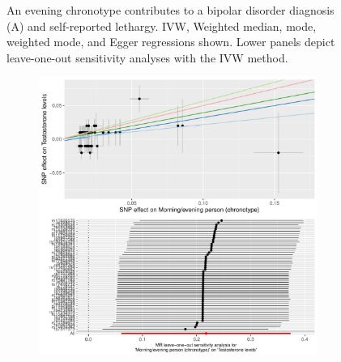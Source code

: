 \documentclass{article}
\begin{document}
\begin{figure}[htbp]
\begin{subfigure}[b]{0.4\textwidth}
         \caption{}
         \label{beer}
     \end{subfigure}
        \caption{An evening chronotype contributes to a bipolar disorder diagnosis (A) and self-reported lethargy. IVW, Weighted median, mode, weighted mode, and Egger regressions shown. Lower panels depict leave-one-out sensitivity analyses with the IVW method.}
        \label{bplethargy}
\end{figure}

\begin{figure}[htbp]
     \centering
     \begin{subfigure}[b]{0.4\textwidth}
         \centering
         \includegraphics[width=\textwidth]{Figs/Analysis2/Morning_evening_person_(chronotype)_vs_Testosterone_levels.Plots.pdf}
         \caption{}
         \label{testosterone}
     \end{subfigure}
     \begin{subfigure}[b]{0.4\textwidth}
         \centering

\end{subfigure}
\end{figure}
\end{document}
